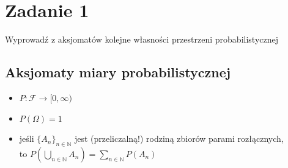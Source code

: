 \section{Zadanie 1}
Wyprowadź z aksjomatów kolejne własności przestrzeni probabilistycznej

\subsection*{Aksjomaty miary probabilistycznej}
\begin{itemize}
	\item \(P \colon \mathcal F \to [0, \infty)\)
	\item \(P(\Omega) = 1\)
	\item jeśli \(\{A_n\}_{n\in\mathbb N}\) jest (przeliczalną!) rodziną
	      zbiorów parami rozłącznych,\\ to
	      \(P(\bigcup_{n\in\mathbb N} A_n) = \sum_{n\in\mathbb N} P(A_n)\)
\end{itemize}

